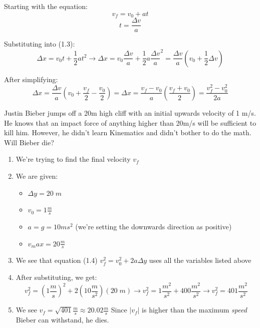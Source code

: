 \begin{solution}
Starting with the equation:
\begin{equation*} v_f = v_0 + at\end{equation*}
\begin{equation*} t=\frac{\Delta v}{a} \end{equation*}

Substituting into (1.3):
\begin{equation*}
    \Delta x = v_0 t + \frac{1}{2}at^2 \rightarrow
    \Delta x = v_0 \frac{\Delta v}{a} + \frac{1}{2}a\frac{\Delta v}{a}^2 =
    \frac{\Delta v}{a}(v_0  + \frac{1}{2}\Delta v)
\end{equation*}

After simplifying:
$$
    \Delta x = \frac{\Delta v}{a}(v_0  + \frac{v_f}{2} - \frac{v_0}{2}) =
    \Delta x = \frac{v_f-v_0}{a}(\frac{v_f+v_0}{2}) = \frac{v_f^2-v_0^2}{2a}
$$


\end{solution}


\begin{question}
Justin Bieber jumps off a 20m high cliff with an initial upwards velocity of 1 m/s. He knows that an impact force of anything higher than 20m/s will be sufficient to kill him. However, he didn't learn Kinematics and didn't bother to do the math. Will Bieber die?
\end{question}

\begin{solution}

\begin{enumerate}
    \item We're trying to find the final velocity $v_f$
    \item We are given:
    \begin{itemize}
        \item $\Delta y = 20\;m$
        \item $v_0 = 1\frac{m}{s}$
        \item $a = g = 10{m}{s^2}$ (we're setting the downwards direction as positive)
        \item $v_max = 20\frac{m}{s}$
    \end{itemize}
    \item We see that equation (1.4) $v_f^2 = v_0^2 + 2a\Delta y$ uses all the variables listed above
    \item After substituting, we get:
    \begin{equation}
        v_f^2 = (1\frac{m}{s})^2 + 2(10\frac{m}{s^2})(20\;m) \rightarrow
        v_f^2 = 1\frac{m^2}{s^2} + 400\frac{m^2}{s^2} \rightarrow
        v_f^2 = 401\frac{m^2}{s^2}
    \end{equation}
    \item We see $v_f = \sqrt{401}\frac{m}{s} \approx 20.02\frac{m}{s}$ Since $|v_f|$ is higher than the maximum \emph{speed} Bieber can withstand, he dies.
\end{enumerate}

\end{solution}

